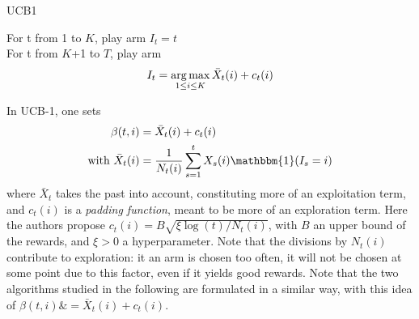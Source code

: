 \begin{algorithm}
    \caption{UCB1}
	\label{alg:ucb1}
    For t from 1 to $K$, play arm $I_t = t$ \\
    For t from $K$+1 to $T$, play arm 
    $$ I_t = \operatorname*{arg\,max}_{1\leq i \leq K} \bar X_t(i) + c_t(i)$$
\end{algorithm}


In UCB-1, one sets 
\begin{align}
\beta(t,i)& =\bar{X}_t(i)+c_t(i)\\
\text{with } \bar{X}_t(i) &= \frac{1}{N_t(i)}\sum_{s=1}^t X_s(i)\mathbbm{1}(I_s=i)
\end{align}
where $\bar{X}_t$ takes the past into account, constituting more of an exploitation term, and $c_t(i)$ is a \textit{padding function}, meant to be more of an exploration term. Here the authors propose $c_t(i)=B\sqrt{\xi \log(t)/N_t(i)}$, with $B$ an upper bound of the rewards, and $\xi>0$ a hyperparameter.
Note that the divisions by $N_t(i)$ contribute to exploration: it an arm is chosen too often, it will not be chosen at some point due to this factor, even if it yields good rewards.
Note that the two algorithms studied in the following are formulated in a similar way, with this idea of $\beta(t,i)\& =\bar{X}_t(i)+c_t(i)$.
